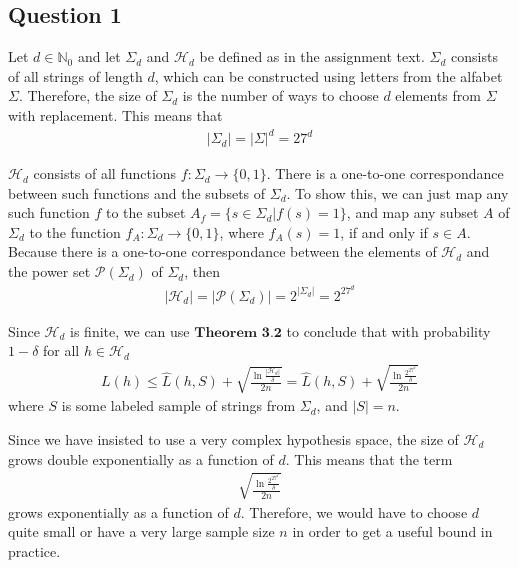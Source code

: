 \subsection{Question 1}
Let $d\in \mathbb{N}_0$ and let $\Sigma_d$ and $\mathcal{H}_d$ be defined as in the assignment text. $\Sigma_d$ consists of all strings of length $d$, which can be constructed using letters from the alfabet $\Sigma$. Therefore, the size of $\Sigma_d$ is the number of ways to choose $d$ elements from $\Sigma$ with replacement. This means that 
\begin{align}
|\Sigma_d| = |\Sigma|^d = 27^d 
\end{align}

$\mathcal{H}_d$ consists of all functions $f: \Sigma_d \to \{0,1\}$. There is a one-to-one correspondance between such functions and the subsets of $\Sigma_d$. To show this, we can just map any such function $f$ to the subset $A_f = \{ s \in \Sigma_d | f(s) = 1 \}$, and map any subset $A$ of $\Sigma_d$ to the function $f_A: \Sigma_d \to \{0,1\}$, where $f_A(s)=1$, if and only if $s\in A$. Because there is a one-to-one correspondance between the elements of $\mathcal{H}_d$ and the power set $\mathcal{P}(\Sigma_d)$ of $\Sigma_d$, then
\begin{align}
|\mathcal{H}_d| = |\mathcal{P}(\Sigma_d)| = 2^{|\Sigma_d|}=2^{27^d}
\end{align}

Since $\mathcal{H}_d$ is finite, we can use $\textbf{Theorem 3.2}$ to conclude that with probability $1 - \delta$ for all $h \in \mathcal{H}_d$
\begin{align}
L(h) \leq \hat{L}(h, S) + \sqrt{\frac{\ln \frac{|\mathcal{H}_d|}{\delta}}{2n}} = \hat{L}(h, S) + \sqrt{\frac{\ln \frac{2^{27^d}}{\delta}}{2n}}
\end{align}
where $S$ is some labeled sample of strings from $\Sigma_d$, and $|S|=n$. 

Since we have insisted to use a very complex hypothesis space, the size of $\mathcal{H}_d$ grows double exponentially as a function of $d$. This means that the term 
\begin{align}
\sqrt{\frac{\ln \frac{2^{27^d}}{\delta}}{2n}}
\end{align}
grows exponentially as a function of $d$. Therefore, we would have to choose $d$ quite small or have a very large sample size $n$ in order to get a useful bound in practice.

